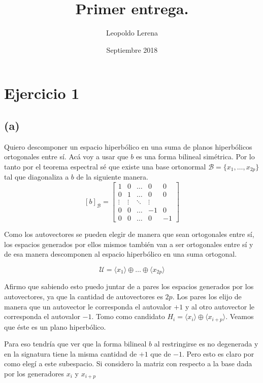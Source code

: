 \documentclass{article}
\title{Primer entrega.}
\author{Leopoldo Lerena }
\date{Septiembre 2018}
\begin{document}
\maketitle

\section*{Ejercicio 1}
\subsection*{(a)}
Quiero descomponer un espacio hiperbólico en una suma de planos hiperbólicos ortogonales entre sí. Acá voy a usar que $b$ es una forma bilineal simétrica. Por lo tanto por el teorema espectral sé que existe una base ortonormal $\mathcal{B} = \{ x_1, \dots, x_{2p}\}$ tal que  diagonaliza a $b$ de la siguiente manera.
\[
[b]_{\mathcal{B}}
=
\begin{bmatrix}
1 & 0  & \dots & 0 & 0 \\
0 & 1  & \dots & 0 & 0 \\
\vdots & \vdots  & \ddots & \vdots \\
0 & 0  & \dots & -1 & 0 \\
0 & 0  & \dots & 0 & -1
\end{bmatrix}
\]

Como los autovectores se pueden elegir de manera que sean ortogonales entre sí, los espacios generados por ellos mismos también van a ser ortogonales entre sí y de esa manera descomponen al espacio hiperbólico en una suma ortogonal.

\[ \mathcal{U} = \langle x_1 \rangle \oplus \dots \oplus \langle x_{2p} \rangle \]

 Afirmo que sabiendo esto puedo juntar de a pares los espacios generados por los autovectores, ya que la cantidad de autovectores es $2p$. Los pares los elijo de manera que un autovector le corresponda el autovalor $+1$ y al otro autovector le corresponda el autovalor $-1$. Tomo como candidato $H_{i} = \langle x_i \rangle \oplus \langle x_{i+p} \rangle $. Veamos que éste es un plano hiperbólico. 
 
 Para eso tendría que ver que la forma bilineal $b$ al restringirse es no degenerada y en la signatura tiene la misma cantidad de $+1$ que de $-1$. Pero esto es claro por como elegí a este subespacio. Si considero la matriz con respecto a la base dada por los generadores $x_i$ y $x_{i+p}$
 
\end{document}
